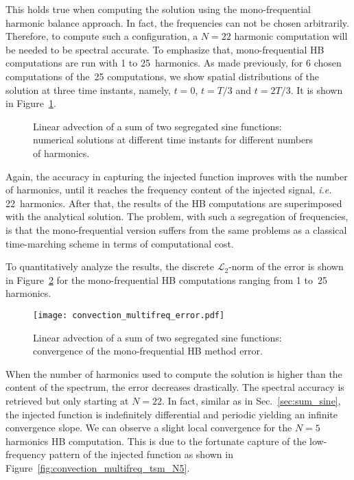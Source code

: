 This holds true when computing the solution using the mono-frequential
harmonic balance approach. In fact, the frequencies can not be chosen arbitrarily.
Therefore, to compute such a configuration, a $N=22$ harmonic computation
will be needed to be spectral accurate. To emphasize that, mono-frequential
HB computations are run with 1 to 25~harmonics.
As made previously, 
for 6 chosen computations of the~25 computations, 
we show spatial distributions of the solution
at three time instants, namely, $t=0$, $t=T/3$ and $t=2T/3$.
It is shown in Figure~\ref{fig:inj_multifreq_tsm}.
\begin{figure}[htp]
  \centering
  \caption{Linear advection of a sum of two segregated sine functions: 
  numerical solutions at different time instants for different numbers of harmonics.}
  \label{fig:inj_multifreq_tsm}
\end{figure}
Again, the accuracy in capturing the injected function
improves with the number of harmonics,
until it reaches the frequency content
of the injected signal, \emph{i.e.} 22~harmonics.
After that, the results of the HB computations are
superimposed with the analytical solution. 
The problem, with such a segregation of frequencies, is that 
the mono-frequential version suffers from the same
problems as a classical time-marching scheme in terms of 
computational cost.

To quantitatively analyze the results,
the discrete $\mathcal{L}_2$-norm of the error 
is shown in Figure~\ref{fig:conv_multifreq_tsm} for the
mono-frequential HB computations ranging from 1 to~25
harmonics.
\begin{figure}[htp]
  \centering
  \texttt{[image: convection\_multifreq\_error.pdf]}
  \caption{Linear advection of a sum of two segregated sine functions: convergence of the mono-frequential HB method error.}
  \label{fig:conv_multifreq_tsm}
\end{figure}
When the number of harmonics
used to compute the solution is higher than the content of the spectrum,
the error decreases drastically. The spectral accuracy is retrieved
but only starting at $N=22$.
In fact, similar as in Sec.~\ref{sec:sum_sine},
the injected function is indefinitely differential and periodic
yielding an infinite convergence slope. We can observe a slight local convergence
for the $N=5$ harmonics HB computation. This is due to the fortunate 
capture of the low-frequency pattern of the injected function
as shown in Figure~\ref{fig:convection_multifreq_tsm_N5}.

